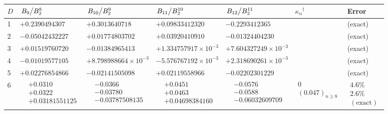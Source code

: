 \documentclass[aip,jcp,preprint,superscriptaddress,showpacs,preprintnumbers,amsmath,amssymb]{revtex4-1}
\begin{document}
\begin{table*}\scriptsize
\newcommand{\vsp}{-2mm}
\begin{tabular}{l l l l l l l}
\hline
$D$
&
$\left. B_{9} \middle/ B_2^{8}\right.$
&
$\left. B_{10} \middle/ B_2^{9}\right.$
&
$\left. B_{11} \middle/ B_2^{10}\right.$
&
$\left. B_{12} \middle/ B_2^{11}\right.$
&
${\kappa_n}^\dagger$
&
Error
\\
\hline
1
&
$+0.2390494307$
&
$+0.3013640718$
&
$+0.09833412320$
&
$-0.2293412365$
&
&
(exact)
\\
\hline
2
&
$-0.05042432227$
&
$+0.01774803702$
&
$+0.03920410910$
&
$-0.01324404230$
&
&
(exact)
\\
\hline
3
&
$+0.01519760720$
&
$-0.01384965413$
&
$+1.334757917\times10^{-3}$
&
$+7.604327249\times10^{-3}$
&
&
(exact)
\\
\hline
4
&
$-0.01019577105$
&
$+8.798988664\times10^{-3}$
&
$-5.576767192\times10^{-3}$
&
$+2.318690261\times10^{-3}$
&
&
(exact)
\\
\hline
5
&
$+0.02276854866$
&
$-0.02141505098$
&
$+0.02119558966$
&
$-0.02202301229$
&
&
(exact)
\\
\hline
6
&
$\begin{aligned}
&+0.0310 \\[\vsp]
&+0.0322 \\[\vsp]
&+0.03181551125
\end{aligned}$
&
$\begin{aligned}
&-0.0366 \\[\vsp]
&-0.03780 \\[\vsp]
&-0.03787508135
\end{aligned}$
&
$\begin{aligned}
&+0.0451 \\[\vsp]
&+0.0463 \\[\vsp]
&+0.04698384160
\end{aligned}$
&
$\begin{aligned}
&-0.0576 \\[\vsp]
&-0.0588 \\[\vsp]
&-0.06032609709
\end{aligned}$
&
$\begin{aligned}
0 \\[\vsp]
(0.047)_{n \ge 8} \\[\vsp]
\,
\end{aligned}$
&
$\begin{aligned}
4.6\% \\[\vsp]
2.6\% \\[\vsp]
\mathrm{(exact)}
\end{aligned}$

\end{tabular}
\end{table*}
\end{document}
